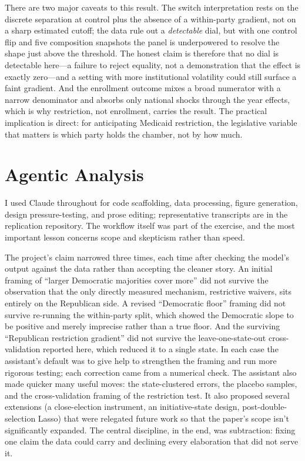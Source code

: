 \documentclass[9pt,twoside]{pnas-new}
\begin{document}
There are two major caveats to this result. The switch interpretation rests on the discrete separation at control plus the absence of a within-party gradient, not on a sharp estimated cutoff; the data rule out a \emph{detectable} dial, but with one control flip and five composition snapshots the panel is underpowered to resolve the shape just above the threshold. The honest claim is therefore that no dial is detectable here---a failure to reject equality, not a demonstration that the effect is exactly zero---and a setting with more institutional volatility could still surface a faint gradient. And the enrollment outcome mixes a broad numerator with a narrow denominator and absorbs only national shocks through the year effects, which is why restriction, not enrollment, carries the result. The practical implication is direct: for anticipating Medicaid restriction, the legislative variable that matters is which party holds the chamber, not by how much.

\section*{Agentic Analysis}

I used Claude throughout for code scaffolding, data processing, figure generation, design pressure-testing, and prose editing; representative transcripts are in the replication repository. The workflow itself was part of the exercise, and the most important lesson concerns scope and skepticism rather than speed.

The project's claim narrowed three times, each time after checking the model's output against the data rather than accepting the cleaner story. An initial framing of ``larger Democratic majorities cover more'' did not survive the observation that the only directly measured mechanism, restrictive waivers, sits entirely on the Republican side. A revised ``Democratic floor'' framing did not survive re-running the within-party split, which showed the Democratic slope to be positive and merely imprecise rather than a true floor. And the surviving ``Republican restriction gradient'' did not survive the leave-one-state-out cross-validation reported here, which reduced it to a single state. In each case the assistant's default was to give help to strengthen the framing and run more rigorous testing; each correction came from a numerical check. The assistant also made quicker many useful moves: the state-clustered errors, the placebo samples, and the cross-validation framing of the restriction test. It also proposed several extensions (a close-election instrument, an initiative-state design, post-double-selection Lasso) that were relegated future work so that the paper's scope isn't significantly expanded. The central discipline, in the end, was subtraction: fixing one claim the data could carry and declining every elaboration that did not serve it.
\end{document}

